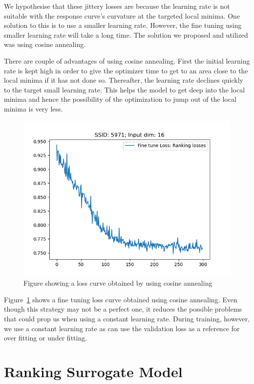 \documentclass[12pt, twoside, ngerman]{report}
\begin{document}
We hypothesise that these jittery losses are because the learning rate is not suitable with the response curve's curvature at the targeted local minima.
One solution to this is to use a smaller learning rate.
However,  the fine tuning using smaller learning rate will take a long time.
The solution we proposed and utilized was using cosine annealing.

There are couple of advantages of using cosine annealing.
First the initial learning rate is kept high in order to give the optimizer time to get to an area close to the local minima if it has not done so.
Thereafter,  the learning rate declines quickly to the target small learning rate.
This helps the model to get deep into the local minima and hence the possibility of the optimization to jump out of the local minima is very less.

\begin{figure}[htb]
  \centering
    \includegraphics[scale=0.45]{images/goodFTLoss}
    \caption{Figure showing a loss curve obtained by using cosine annealing}
    \label{fig:goodFTLoss}
\end{figure}

Figure~\ref{fig:goodFTLoss} shows a fine tuning loss curve obtained using cosine annealing.
Even though this strategy may not be a perfect one,  it reduces the possible problems that could prop us when using a constant learning rate.
During training,  however,  we use a constant learning rate as can use the validation loss as a reference for over fitting or under fitting.

\section{Ranking Surrogate Model}
\end{document}

